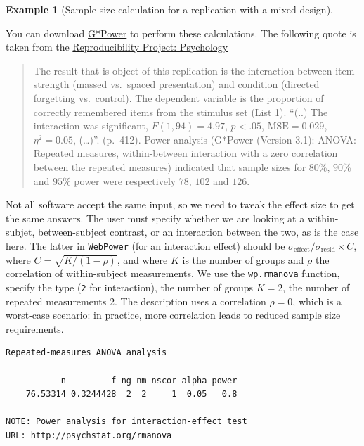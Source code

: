 \documentclass[
  11pt,
  letterpaper,
]{scrbook}
\theoremstyle{definition}
\theoremstyle{definition}
\newtheorem{example}{Example}[chapter]
\theoremstyle{remark}
\begin{document}
\begin{example}[Sample size calculation for a replication with a mixed
design]\protect\hypertarget{exm-power4}{}\label{exm-power4}

You can download
\href{https://www.psychologie.hhu.de/arbeitsgruppen/allgemeine-psychologie-und-arbeitspsychologie/gpower}{G*Power}
to perform these calculations. The following quote is taken from the
\href{https://osf.io/ezcuj/}{Reproducibility Project: Psychology}

\begin{quote}
The result that is object of this replication is the interaction between
item strength (massed vs.~spaced presentation) and condition (directed
forgetting vs.~control). The dependent variable is the proportion of
correctly remembered items from the stimulus set (List 1). ``(..) The
interaction was significant, \(F(1,94)=4.97\), \(p <.05\),
\(\mathrm{MSE} =0.029\), \(\eta^2=0.05\), (\ldots)''. (p.~412). Power
analysis (G*Power (Version 3.1): ANOVA: Repeated measures,
within-between interaction with a zero correlation between the repeated
measures) indicated that sample sizes for \(80\)\%, \(90\)\% and
\(95\)\% power were respectively \(78\), \(102\) and \(126\).
\end{quote}

Not all software accept the same input, so we need to tweak the effect
size to get the same answers. The user must specify whether we are
looking at a within-subjet, between-subject contrast, or an interaction
between the two, as is the case here. The latter in \texttt{WebPower}
(for an interaction effect) should be
\(\sigma_{\text{effect}}/\sigma_{\text{resid}}  \times C\), where
\(C = \sqrt{K/(1-\rho)}\), and where \(K\) is the number of groups and
\(\rho\) the correlation of within-subject measurements. We use the
\texttt{wp.rmanova} function, specify the type (\texttt{2} for
interaction), the number of groups \(K=2\), the number of repeated
measurements \(2\). The description uses a correlation \(\rho=0\), which
is a worst-case scenario: in practice, more correlation leads to reduced
sample size requirements.

\begin{verbatim}
Repeated-measures ANOVA analysis

           n         f ng nm nscor alpha power
    76.53314 0.3244428  2  2     1  0.05   0.8

NOTE: Power analysis for interaction-effect test
URL: http://psychstat.org/rmanova
\end{verbatim}


\end{example}
\end{document}
